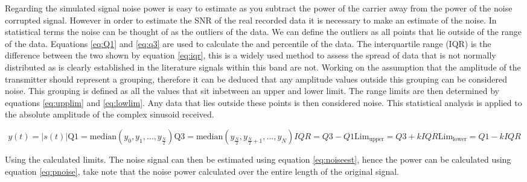 Regarding the simulated signal noise power is easy to estimate as you subtract the power of the carrier away from the power of the noise corrupted signal. However in order to estimate the SNR of the real recorded data it is necessary to make an estimate of the noise. In statistical terms the noise can be thought of as the outliers of the data. We can define the outliers as all points that lie outside of the range of the data. Equations \ref{eq:Q1} and \ref{eq:q3} are used to calculate the  and  percentile of the data. The interquartile range (IQR) is the difference between the two shown by equation \ref{eq:iqr}, this is a widely used method to assess the spread of data that is not normally distributed as is clearly established in the literature signals within this band are not. Working on the assumption that the amplitude of the transmitter should represent a grouping, therefore it can be deduced that any amplitude values outside this grouping can be considered noise. This grouping is defined as all the values that sit inbetween an upper and lower limit.
The range limits are then determined by equations \ref{eq:upplim} and \ref{eq:lowlim}. Any data that lies outside these points is then considered noise. This statistical analysis is applied to the absolute amplitude of the complex sinusoid received.

\begin{multicols}{2}

\begin{subequations}
    \begin{equation}
        y(t) = |s(t)|
    \end{equation}
    \begin{equation}
        \text{Q1} = \text{median}\left(y_{0},y_{1},\dots,y_{\frac{N}{2}}\right)
        \label{eq:Q1}
    \end{equation}
    \begin{equation}
        \text{Q3} = \text{median}\left(y_{\frac{N}{2}},y_{\frac{N}{2}+1},\dots,y_{N}\right)
        \label{eq:q3}
    \end{equation}
    \begin{equation}
        IQR = Q3 - Q1
        \label{eq:iqr}
    \end{equation}
    \begin{equation}
        \text{Lim}_{\text{upper}} = Q3 + k IQR
        \label{eq:upplim}
    \end{equation}
    \begin{equation}
        \text{Lim}_{\text{lower}} = Q1 - k IQR
        \label{eq:lowlim}
    \end{equation}
\end{subequations}
\end{multicols}
Using the calculated limits. The noise signal can then be estimated using equation \ref{eq:noiseest}, hence the power can be calculated using equation \ref{eq:pnoise}, take note that the noise power calculated over the entire length of the original signal. 

